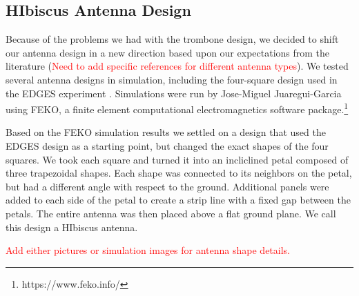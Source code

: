 \subsection{HIbiscus Antenna Design}

Because of the problems we had with the trombone design, we decided to shift our antenna design in a new direction based upon our expectations from the literature (\textcolor{red}{Need to add specific references for different antenna types}). We tested several antenna designs in simulation, including the four-square design used in the EDGES experiment \cite{rogers_2012}. Simulations were run by Jose-Miguel Juaregui-Garcia using FEKO, a finite element computational electromagnetics software package.\footnote{https://www.feko.info/} 

Based on the FEKO simulation results we settled on a design that used the EDGES design as a starting point, but changed the exact shapes of the four squares. We took each square and turned it into an incliclined petal composed of three trapezoidal shapes. Each shape was connected to its neighbors on the petal, but had a different angle with respect to the ground. Additional panels were added to each side of the petal to create a strip line with a fixed gap between the petals. The entire antenna was then placed above a flat ground plane. We call this design a HIbiscus antenna. 

\textcolor{red}{Add either pictures or simulation images for antenna shape details.}


